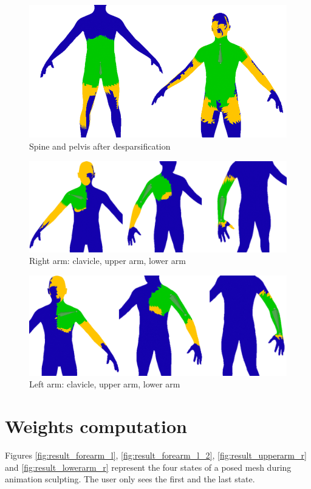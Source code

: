\documentclass[12pt,twoside]{report}
\begin{document}
\newpage

\begin{figure}[hp]
\centering
\includegraphics[width=50ex]{graphics/pelvis_spine.png}
\caption{Spine and pelvis after desparsification}
\label{fig:pelvis_spine}
\end{figure}

\begin{figure}[hp]
\centering
\includegraphics[width=50ex]{graphics/arm_r.png}
\caption{Right arm: clavicle, upper arm, lower arm}
\label{fig:arm_r}
\end{figure}

\begin{figure}[hp]
\centering
\includegraphics[width=46ex]{graphics/arm_l.png}
\caption{Left arm: clavicle, upper arm, lower arm}
\label{fig:arm_l}
\end{figure}

\section{Weights computation}
\label{sec:skinweightsolving_results}
Figures \ref{fig:result_forearm_l}, \ref{fig:result_forearm_l_2}, \ref{fig:result_upperarm_r} and \ref{fig:result_lowerarm_r} represent the four states of a posed mesh during animation sculpting. The user only sees the first and the last state.
\end{document}
